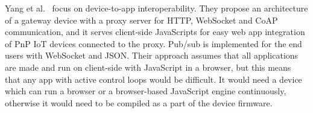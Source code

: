 


Yang et al.~\cite{The_PnP_Web_Tag_A_plug-and-play_programming_model_for_connecting_IoT_devices_to_the_web_of_things} focus on device-to-app interoperability. They propose an architecture of a gateway device with a proxy server for HTTP, WebSocket and CoAP communication, and it serves client-side JavaScripts for easy web app integration of PnP IoT devices connected to the proxy. Pub/sub is implemented for the end users with WebSocket and JSON\@. Their approach assumes that all applications are made and run on client-side with JavaScript in a browser, but this means that any app with active control loops would be difficult. It would need a device which can run a browser or a browser-based JavaScript engine continuously, otherwise it would need to be compiled as a part of the device firmware.

